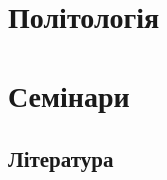 \documentclass[a4paper,12pt,ukrainian]{book}
\begin{document}
\tableofcontents
\chapter{Політологія}







\chapter{Семінари}





\section{Література}
\end{document}
